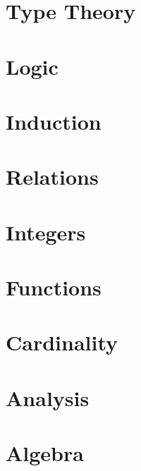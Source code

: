 %






\section{Type Theory}


\section{Logic}


\section{Induction}


\section{Relations}


\section{Integers}


\section{Functions}


\section{Cardinality}


\section{Analysis}


\section{Algebra}



